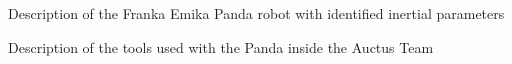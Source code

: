 Description of the Franka Emika Panda robot with identified inertial parameters

Description of the tools used with the Panda inside the Auctus Team 